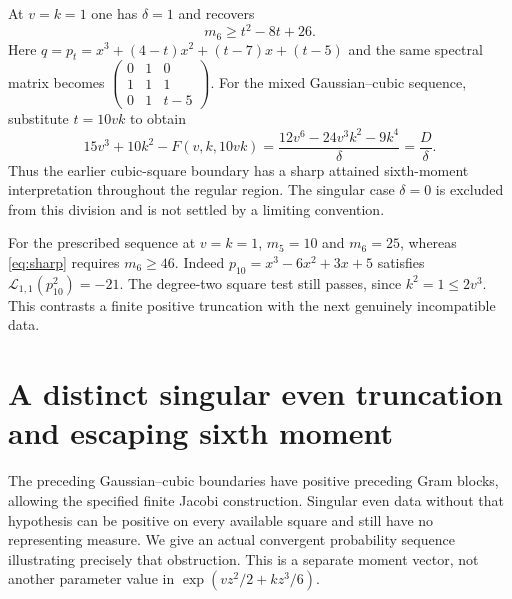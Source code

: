 \documentclass[11pt]{article}
\begin{document}
At $v=k=1$ one has $\delta=1$ and recovers
\begin{equation}\label{eq:sharp}
 m_6\geq t^2-8t+26.
\end{equation}
Here $q=p_t=x^3+(4-t)x^2+(t-7)x+(t-5)$ and the same spectral
matrix becomes $\left(\begin{smallmatrix}0&1&0\\1&1&1\\0&1&t-5\end{smallmatrix}\right)$.
For the mixed Gaussian--cubic sequence, substitute $t=10vk$ to obtain
\[
 15v^3+10k^2-F(v,k,10vk)
 =\frac{12v^6-24v^3k^2-9k^4}{\delta}=\frac D\delta.
\]
Thus the earlier cubic-square boundary has a sharp attained
sixth-moment interpretation throughout the regular region. The
singular case $\delta=0$ is excluded from this division and is not
settled by a limiting convention.

For the prescribed sequence at $v=k=1$, $m_5=10$ and
$m_6=25$, whereas \eqref{eq:sharp} requires $m_6\geq46$.
Indeed $p_{10}=x^3-6x^2+3x+5$ satisfies
$\mathcal L_{1,1}(p_{10}^2)=-21$.
The degree-two square test still passes, since
$k^2=1\leq2v^3$. This contrasts a finite positive
truncation with the next genuinely incompatible data.


\section{A distinct singular even truncation and escaping sixth moment}
The preceding Gaussian--cubic boundaries have positive preceding
Gram blocks, allowing the specified finite Jacobi construction.
Singular even data without that hypothesis can be positive on every
available square and still have no representing measure. We give
an actual convergent probability sequence illustrating precisely
that obstruction. This is a separate moment vector, not another
parameter value in $\exp(vz^2/2+kz^3/6)$.
\end{document}
